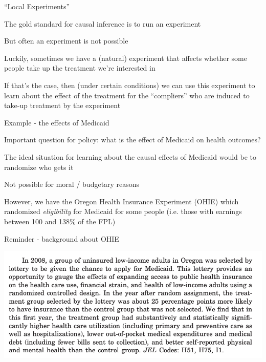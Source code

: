 \documentclass[11pt,english,handout]{beamer}
\newenvironment{wideitemize}{\itemize\addtolength{\itemsep}{10pt}}{\enditemize}
\begin{document}
	\begin{frame}{``Local Experiments''}

		\begin{wideitemize}
			\item
			The gold standard for causal inference is to run an experiment
			
			\item
			But often an experiment is not possible
			
			\pause
			\item
			Luckily, sometimes we have a (natural) experiment that affects whether some people take up the treatment we're interested in  
			
			\pause
			\item
			If that's the case, then (under certain conditions) we can use this experiment to learn about the effect of the treatment for the ``compliers'' who are induced to take-up treatment by the experiment
		\end{wideitemize}

	\end{frame}	

	\begin{frame}{Example - the effects of Medicaid}
		\begin{wideitemize}
			\item
			Important question for policy: what is the effect of Medicaid on health outcomes? 
			
			\pause
			\item
			The ideal situation for learning about the causal effects of Medicaid would be to randomize who gets it
				\begin{wideitemize}
					\pause
					\item
					Not possible for moral / budgetary reasons
				\end{wideitemize}
			
			\pause
			\item
			However, we have the Oregon Health Insurance Experiment (OHIE) which randomized \textit{eligibility} for Medicaid for some people (i.e. those with earnings between 100 and 138\% of the FPL)
		\end{wideitemize}
	\end{frame}


	\begin{frame}{Reminder - background about OHIE}
		
		\includegraphics[width = 0.9\linewidth]{ohie-abstract}
	\end{frame}
\end{document}
